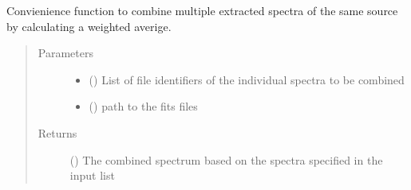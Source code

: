 \documentclass[a4paper,10pt,english]{sphinxmanual}
\begin{document}

\begin{fulllineitems}
\label{\detokenize{cascade.exoplanet_tools:cascade.exoplanet_tools.exoplanet_tools.combine_spectra}}
Convienience function to combine multiple extracted spectra
of the same source by calculating a weighted averige.
\begin{quote}\begin{description}
\item[{Parameters}] \leavevmode\begin{itemize}
\item {} 
 () \textendash{} List of file identifiers of the individual spectra to be combined

\item {} 
 () \textendash{} path to the fits files

\end{itemize}

\item[{Returns}] \leavevmode
{} () \textendash{} The combined spectrum based on the spectra specified in the input list

\end{description}\end{quote}

\end{fulllineitems}

\end{document}
